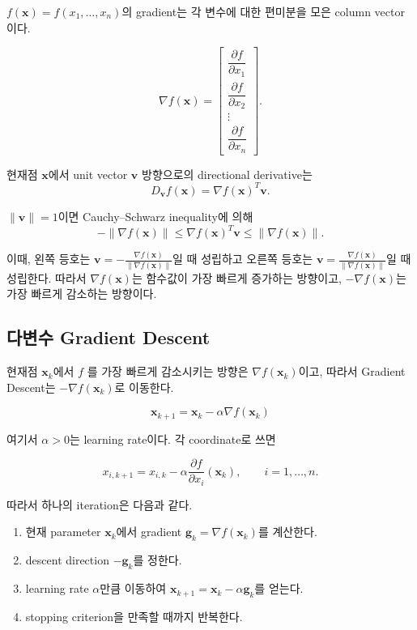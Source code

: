 \documentclass[11pt,a4paper]{article}
\begin{document}
$f(\mathbf{x})=f(x_1,\ldots,x_n)$의 gradient는 각 변수에 대한 편미분을
모은 column vector이다.

\[
    \nabla f(\mathbf{x})
    =
    \begin{bmatrix}
    \dfrac{\partial f}{\partial x_1}\\[2mm]
    \dfrac{\partial f}{\partial x_2}\\
    \vdots\\
    \dfrac{\partial f}{\partial x_n}
    \end{bmatrix}.
\]

현재점 $\mathbf{x}$에서 unit vector $\mathbf{v}$ 방향으로의
directional derivative는
\[
    D_{\mathbf{v}}f(\mathbf{x})
    =
    \nabla f(\mathbf{x})^T\mathbf{v}.
\]

$\|\mathbf{v}\|=1$이면 Cauchy--Schwarz inequality에 의해
\[
    -\|\nabla f(\mathbf{x})\|
    \le
    \nabla f(\mathbf{x})^T\mathbf{v}
    \le
    \|\nabla f(\mathbf{x})\|.
\]

이때, 왼쪽 등호는 $\mathbf{v}=-\frac{\nabla f(\mathbf{x})}{\|\nabla f(\mathbf{x})\|}$일 때 성립하고 오른쪽 등호는
 $\mathbf{v}=\frac{\nabla f(\mathbf{x})}{\|\nabla f(\mathbf{x})\|}$일 때 성립한다. 따라서 $\nabla f(\mathbf{x})$는 함수값이 가장 빠르게 증가하는 방향이고,
$-\nabla f(\mathbf{x})$는 가장 빠르게 감소하는 방향이다.


\subsection{다변수 Gradient Descent}

현재점 $\mathbf{x}_k$에서 $f$ 를 가장 빠르게 감소시키는 방향은 $\nabla f(\mathbf{x}_k)$이고, 따라서 Gradient Descent는
$-\nabla f(\mathbf{x}_k)$로 이동한다.

\[
    \boxed{
    \mathbf{x}_{k+1}
    =
    \mathbf{x}_k-\alpha\nabla f(\mathbf{x}_k)
    }
\]

여기서 $\alpha>0$는 learning rate이다. 각 coordinate로 쓰면

\[
    x_{i,k+1}
    =
    x_{i,k}
    -
    \alpha
    \frac{\partial f}{\partial x_i}(\mathbf{x}_k),
    \qquad
    i=1,\ldots,n.
\]

따라서 하나의 iteration은 다음과 같다.

\begin{enumerate}[leftmargin=2.5em]
    \item 현재 parameter $\mathbf{x}_k$에서
    gradient $\mathbf{g}_k=\nabla f(\mathbf{x}_k)$를 계산한다.
    \item descent direction $-\mathbf{g}_k$를 정한다.
    \item learning rate $\alpha$만큼 이동하여
    $\mathbf{x}_{k+1}=\mathbf{x}_k-\alpha\mathbf{g}_k$를 얻는다.
    \item stopping criterion을 만족할 때까지 반복한다.
\end{enumerate}
\end{document}
